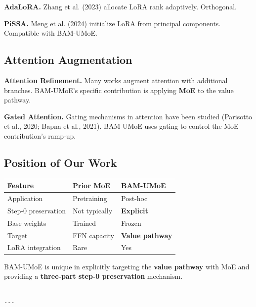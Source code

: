 \textbf{AdaLoRA.} Zhang et al. (2023) allocate LoRA rank adaptively. Orthogonal.

\textbf{PiSSA.} Meng et al. (2024) initialize LoRA from principal components. 
Compatible with BAM-UMoE.

\subsection{Attention Augmentation}

\textbf{Attention Refinement.} Many works augment attention with additional 
branches. BAM-UMoE's specific contribution is applying \textbf{MoE} to the 
value pathway.

\textbf{Gated Attention.} Gating mechanisms in attention have been studied 
(Parisotto et al., 2020; Bapna et al., 2021). BAM-UMoE uses gating to 
control the MoE contribution's ramp-up.

\subsection{Position of Our Work}

\begin{table}[H]
\centering
\small
\begin{tabular}{lll}
\toprule
\textbf{Feature} & \textbf{Prior MoE} & \textbf{BAM-UMoE} \\
\midrule
Application & Pretraining & Post-hoc \\
Step-0 preservation & Not typically & \textbf{Explicit} \\
Base weights & Trained & Frozen \\
Target & FFN capacity & \textbf{Value pathway} \\
LoRA integration & Rare & Yes \\
\bottomrule
\end{tabular}
\end{table}

BAM-UMoE is unique in explicitly targeting the \textbf{value pathway} with MoE 
and providing a \textbf{three-part step-0 preservation} mechanism.
\begin{lstlisting}

---
\end{lstlisting}